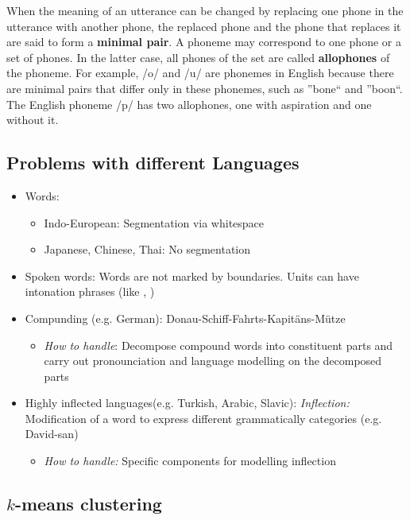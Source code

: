 \documentclass[11pt]{article}
\begin{document}
When the meaning of an utterance can be changed by replacing one phone in the utterance with another phone, the replaced phone and the phone that replaces it are said to form a \textbf{minimal pair}.
A phoneme may correspond to one phone or a set of phones. In the latter case, all phones of the set are called \textbf{allophones} of the phoneme.
For example, /o/ and /u/ are phonemes in English because there are minimal pairs that differ only in these phonemes, such as ''bone`` and ''boon``. The English phoneme /p/ has two allophones, one with aspiration and one without it.

\subsection{Problems with different Languages}
\begin{itemize}
\item{Words:}
\begin{itemize}
\item{Indo-European:} Segmentation via whitespace
\item{Japanese, Chinese, Thai:} No segmentation
\end{itemize}

\item{Spoken words:} Words are not marked by boundaries. Units can have intonation phrases (like , )

\item{Compunding (e.g. German):} Donau-Schiff-Fahrts-Kapitäns-Mütze 
\begin{itemize}
\item \emph{How to handle}: Decompose compound words into constituent parts and carry out pronounciation and language modelling on the decomposed parts
\end{itemize}
 
 \item Highly inflected languages(e.g. Turkish, Arabic, Slavic): \emph{Inflection:} Modification of a word to express different grammatically categories (e.g. David-san) 
 \begin{itemize}
 \item \emph{How to handle:} Specific components for modelling inflection
 \end{itemize}

\end{itemize}


\subsection{$k$-means clustering}
\end{document}
